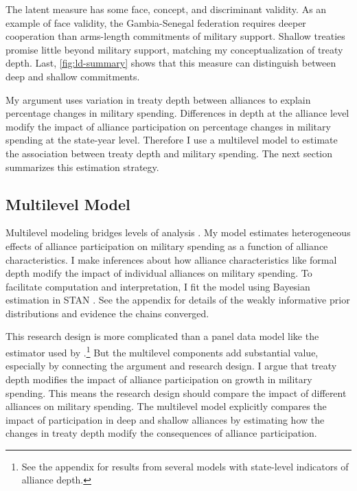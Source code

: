 \documentclass[12pt]{article}
\begin{document}
The latent measure has some face, concept, and discriminant validity. 
As an example of face validity, the Gambia-Senegal federation requires deeper cooperation than arms-length commitments of military support. 
Shallow treaties promise little beyond military support, matching my conceptualization of treaty depth. 
Last, \autoref{fig:ld-summary} shows that this measure can distinguish between deep and shallow commitments. 


My argument uses variation in treaty depth between alliances to explain percentage changes in military spending.
Differences in depth at the alliance level modify the impact of alliance participation on percentage changes in military spending at the state-year level. 
Therefore I use a multilevel model to estimate the association between treaty depth and military spending.  
The next section summarizes this estimation strategy. 


\subsection{Multilevel Model} 


Multilevel modeling bridges levels of analysis \citep{SteenbergenJones2002, GelmanHill2007}. 
My model estimates heterogeneous effects of alliance participation on military spending as a function of alliance characteristics. 
I make inferences about how alliance characteristics like formal depth modify the impact of individual alliances on military spending. 
To facilitate computation and interpretation, I fit the model using Bayesian estimation in STAN \citep{Carpenteretal2016}. 
See the appendix for details of the weakly informative prior distributions and evidence the chains converged.


This research design is more complicated than a panel data model like the estimator used by \citet{DigiuseppePoast2016}.\footnote{See the appendix for results from several models with state-level indicators of alliance depth.}
But the multilevel components add substantial value, especially by connecting the argument and research design.
I argue that treaty depth modifies the impact of alliance participation on growth in military spending. 
This means the research design should compare the impact of different alliances on military spending. 
The multilevel model explicitly compares the impact of participation in deep and shallow alliances by estimating how the changes in treaty depth modify the consequences of alliance participation. 
\end{document}
